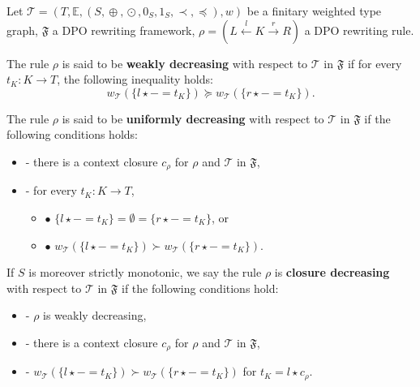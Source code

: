 \begin{definition}
    \label{wf:def:decreasing_rule}
    Let $\mathcal{T} \mathop{=} (T,\mathbb{E}, (S, \mathop{\oplus}, \mathop{\odot}, 0_S, 1_S, \prec, \mathop{\preceq}),w)$ be a finitary weighted type graph, \(\mathfrak{F}\) a DPO rewriting framework, $\rho \mathop{=} (L \overset{l}{\leftarrow} K \overset{r}{\rightarrow} R)$ a DPO rewriting rule.
 
    \noindent
    The rule $\rho$ is said to be \textbf{weakly decreasing} with respect to $\mathcal{T}$ in $\mathfrak{F}$ if 
            for every $t_K : K \mathop{\to} T$, the following inequality holds:
                $$ 
                  w_\mathcal{T}(\{l \mathop{\star} - \mathop{=} t_K\}) \mathop{\succeq} w_\mathcal{T}(\{r\star - \mathop{=} t_K\}).$$
           
    \noindent
    The rule $\rho$ is said to be \textbf{uniformly decreasing} with respect to $\mathcal{T}$ in $\mathfrak{F}$ if the following conditions holds:
        \begin{itemize}
            \item[]- there is a context closure $c_\rho$ for $\rho$ and $\mathcal{T}$ in $\mathfrak{F}$, 
            \item[]- for every $t_K : K \mathop{\to} T$,
            \begin{itemize}
                \item[] $\bullet$ $\{l \mathop{\star} - \mathop{=} t_K\} \mathop{=} \emptyset \mathop{=} \{r \mathop{\star} - \mathop{=} t_K\}$, or
                \item[] $\bullet$ $w_\mathcal{T}(\{l \mathop{\star} - \mathop{=} t_K\}) 
                        \mathop{\succ}   w_\mathcal{T}(\{r \mathop{\star} - \mathop{=} t_K\}) $.
            \end{itemize}
        \end{itemize}  
         
    \noindent
   If $S$ is moreover strictly monotonic, we say the rule $\rho$ is
            \textbf{closure decreasing} with respect to $\mathcal{T}$ in $\mathfrak{F}$ if the following conditions hold:
            \begin{itemize}
                \item[]- $\rho$ is weakly decreasing,
                \item[]- there is a context closure $c_\rho$ for $\rho$ and $\mathcal{T}$ in $\mathfrak{F}$,
                \item[]- $w_\mathcal{T}(\{l \mathop{\star} - \mathop{=} t_K\})  
                \mathop{\succ}  w_\mathcal{T}(\{r \mathop{\star} - \mathop{=} t_K\})$ for $t_K \mathop{=} l \mathop{\star} c_\rho$.
            \end{itemize}
\end{definition}

